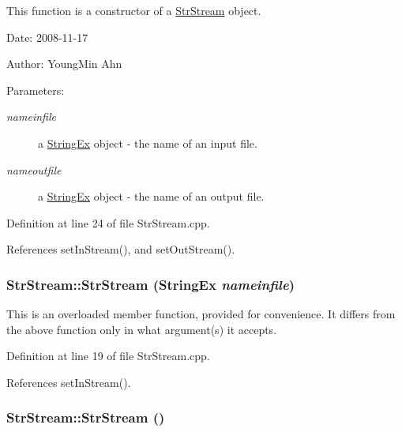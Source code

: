 This function is a constructor of a \hyperlink{classkmaOrange_1_1StrStream}{StrStream} object. 

\begin{Desc}
\item[Date:]2008-11-17 \end{Desc}
\begin{Desc}
\item[Author:]YoungMin Ahn \end{Desc}
\begin{Desc}
\item[Parameters:]
\begin{description}
\item[{\em nameinfile}]a \hyperlink{classStringEx}{StringEx} object - the name of an input file. \item[{\em nameoutfile}]a \hyperlink{classStringEx}{StringEx} object - the name of an output file. \end{description}
\end{Desc}


Definition at line 24 of file StrStream.cpp.

References setInStream(), and setOutStream().\hypertarget{classkmaOrange_1_1StrStream_43671c7f0630f630c346e61df2e8ec5b}{
\subsubsection[{StrStream}]{\setlength{\rightskip}{0pt plus 5cm}StrStream::StrStream ({\bf StringEx} {\em nameinfile})}}
\label{classkmaOrange_1_1StrStream_43671c7f0630f630c346e61df2e8ec5b}


This is an overloaded member function, provided for convenience. It differs from the above function only in what argument(s) it accepts. 

Definition at line 19 of file StrStream.cpp.

References setInStream().\hypertarget{classkmaOrange_1_1StrStream_f828ced82d9272444be6bcfc60b33fd5}{
\subsubsection[{StrStream}]{\setlength{\rightskip}{0pt plus 5cm}StrStream::StrStream ()}}
\label{classkmaOrange_1_1StrStream_f828ced82d9272444be6bcfc60b33fd5}


